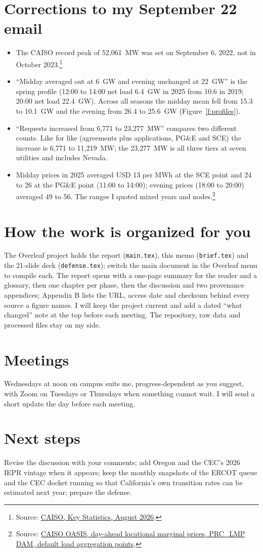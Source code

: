 \documentclass[11pt]{article}
\newcommand{\src}[2]{\footnote{Source: \href{#1}{#2}.}}
\begin{document}
\section*{Corrections to my September 22 email}
\begin{itemize}
\item The CAISO record peak of 52,061~MW was set on September 6, 2022, not in October 2023.\src{https://www.caiso.com/documents/key-statistics-aug-2026.pdf}{CAISO, Key Statistics, August 2026}
\item ``Midday averaged out at 6~GW and evening unchanged at 22~GW'' is the spring profile (12:00 to 14:00 net load 6.4~GW in 2025 from 10.6 in 2019; 20:00 net load 22.4~GW). Across all seasons the midday mean fell from 15.3 to 10.1~GW and the evening from 26.4 to 25.6~GW (Figure~\ref{f:profiles}).
\item ``Requests increased from 6,771 to 23,277~MW'' compares two different counts. Like for like (agreements plus applications, PG\&E and SCE) the increase is 6,771 to 11,219~MW; the 23,277~MW is all three tiers at seven utilities and includes Nevada.
\item Midday prices in 2025 averaged USD 13 per MWh at the SCE point and 24 to 26 at the PG\&E point (11:00 to 14:00); evening prices (18:00 to 20:00) averaged 49 to 56. The ranges I quoted mixed years and nodes.\src{https://oasis.caiso.com/oasisapi/SingleZip?queryname=PRC_LMP&market_run_id=DAM&version=12}{CAISO OASIS, day-ahead locational marginal prices, PRC\_LMP DAM, default load aggregation points}
\end{itemize}

\section*{How the work is organized for you}
The Overleaf project holds the report (\texttt{main.tex}), this memo (\texttt{brief.tex}) and the 21-slide deck (\texttt{defense.tex}); switch the main document in the Overleaf menu to compile each. The report opens with a one-page summary for the reader and a glossary, then one chapter per phase, then the discussion and two provenance appendices; Appendix B lists the URL, access date and checksum behind every source a figure names. I will keep the project current and add a dated ``what changed'' note at the top before each meeting. The repository, raw data and processed files stay on my side.

\section*{Meetings}
Wednesdays at noon on campus suits me, progress-dependent as you suggest, with Zoom on Tuesdays or Thursdays when something cannot wait. I will send a short update the day before each meeting.

\section*{Next steps}
Revise the discussion with your comments; add Oregon and the CEC's 2026 IEPR vintage when it appears; keep the monthly snapshots of the ERCOT queue and the CEC docket running so that California's own transition rates can be estimated next year; prepare the defense.
\end{document}
